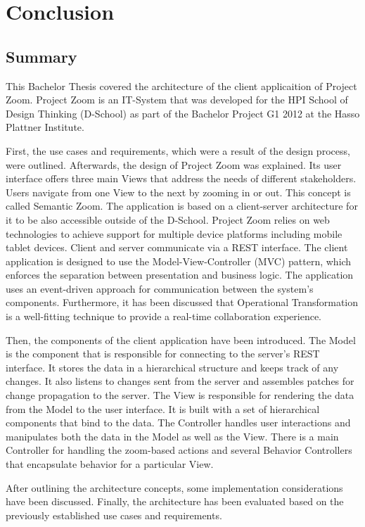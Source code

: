 \chapter{Conclusion}

\section{Summary}
This Bachelor Thesis covered the architecture of the client applicaition of Project Zoom. Project Zoom is an IT-System that was developed for the HPI School of Design Thinking (D-School) as part of the Bachelor Project G1 2012 at the Hasso Plattner Institute.

First, the use cases and requirements, which were a result of the design process, were outlined. Afterwards, the design of Project Zoom was explained. Its user interface offers three main Views that address the needs of different stakeholders. Users navigate from one View to the next by zooming in or out. This concept is called Semantic Zoom. The application is based on a client-server architecture for it to be also accessible outside of the D-School. Project Zoom relies on web technologies to achieve support for multiple device platforms including mobile tablet devices. Client and server communicate via a REST interface. The client application is designed to use the Model-View-Controller (MVC) pattern, which enforces the separation between presentation and business logic. The application uses an event-driven approach for communication between the system's components. Furthermore, it has been discussed that Operational Transformation is a well-fitting technique to provide a real-time collaboration experience. 

Then, the components of the client application have been introduced. The Model is the component that is responsible for connecting to the server's REST interface. It stores the data in a hierarchical structure and keeps track of any changes. It also listens to changes sent from the server and assembles patches for change propagation to the server. The View is responsible for rendering the data from the Model to the user interface. It is built with a set of hierarchical components that bind to the data. The Controller handles user interactions and manipulates both the data in the Model as well as the View. There is a main Controller for handling the zoom-based actions and several Behavior Controllers that encapsulate behavior for a particular View. 

After outlining the architecture concepts, some implementation considerations have been discussed. Finally, the architecture has been evaluated based on the previously established use cases and requirements.

